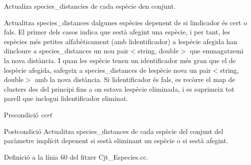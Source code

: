 Actualiza species\+\_\+distancies de cada espècie d\textquotesingle{}en conjunt. 

Actualitza species\+\_\+distances d\textquotesingle{}algunes espècies depenent de si l\textquotesingle{}indicador és cert o fals. El primer dels casos indica que s\textquotesingle{}està afegint una espècie, i per tant, les espècies més petites alfabèticament (amb l\textquotesingle{}identificador) a l\textquotesingle{}espècie afegida han d\textquotesingle{}incloure a species\+\_\+distances un nou pair$<$string, double$>$ que emmagatzemi la nova distància. I quan les espècie tenen un identificador més gran que el de l\textquotesingle{}espècie afegida, s\textquotesingle{}afegeix a species\+\_\+distances de l\textquotesingle{}espècie nova un pair$<$string, double$>$ amb la nova distància. Si l\textquotesingle{}identificador és fals, es recòrre el map de clusters des del principi fins a on estava l\textquotesingle{}espècie eliminada, i es suprimeix tot parell que inclogui l\textquotesingle{}identificador eliminat.

\begin{DoxyPrecond}{Precondició}
{\itshape cert} 
\end{DoxyPrecond}
\begin{DoxyPostcond}{Postcondició}
Actualitza species\+\_\+distances de cada espècie del conjunt del paràmetre implícit depenent si s\textquotesingle{}està eliminant un espècie o si s\textquotesingle{}està afegint. 
\end{DoxyPostcond}


Definició a la línia 60 del fitxer Cjt\+\_\+\+Especies.\+cc.



